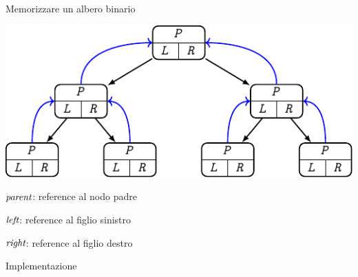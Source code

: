 \begin{frame}{Memorizzare un albero binario}
	
\vspace{-12pt}
\begin{center}
\includegraphics{albero-bin-store.pdf}
\end{center}

\begin{myboxtitle}
\BI
\item \alert{$\textit{parent}$}: reference al nodo padre
\item \alert{$\textit{left}$}: reference al figlio sinistro
\item \alert{$\textit{right}$}: reference al figlio destro
\EI
\end{myboxtitle}

\end{frame}


\begin{frame}[shrink=15]{Implementazione}

\vspace{-12pt}


\end{frame}

